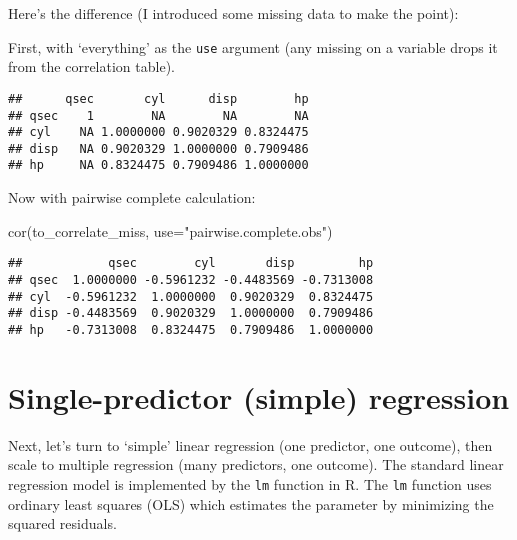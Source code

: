 \documentclass[
]{book}
\newenvironment{Shaded}{\begin{snugshade}}{\end{snugshade}}
\newcommand{\AttributeTok}[1]{\textcolor[rgb]{0.77,0.63,0.00}{#1}}
\newcommand{\CommentTok}[1]{\textcolor[rgb]{0.56,0.35,0.01}{\textit{#1}}}
\newcommand{\ConstantTok}[1]{\textcolor[rgb]{0.00,0.00,0.00}{#1}}
\newcommand{\DecValTok}[1]{\textcolor[rgb]{0.00,0.00,0.81}{#1}}
\newcommand{\FunctionTok}[1]{\textcolor[rgb]{0.00,0.00,0.00}{#1}}
\newcommand{\NormalTok}[1]{#1}
\newcommand{\OtherTok}[1]{\textcolor[rgb]{0.56,0.35,0.01}{#1}}
\newcommand{\SpecialCharTok}[1]{\textcolor[rgb]{0.00,0.00,0.00}{#1}}
\newcommand{\StringTok}[1]{\textcolor[rgb]{0.31,0.60,0.02}{#1}}
\begin{document}
Here's the difference (I introduced some missing data to make the point):

First, with `everything' as the \texttt{use} argument (any missing on a variable drops it from the correlation table).

\begin{Shaded}
\end{Shaded}

\begin{verbatim}
##      qsec       cyl      disp        hp
## qsec    1        NA        NA        NA
## cyl    NA 1.0000000 0.9020329 0.8324475
## disp   NA 0.9020329 1.0000000 0.7909486
## hp     NA 0.8324475 0.7909486 1.0000000
\end{verbatim}

Now with pairwise complete calculation:

\begin{Shaded}
\begin{Highlighting}[]
\FunctionTok{cor}\NormalTok{(to\_correlate\_miss, }\AttributeTok{use=}\StringTok{"pairwise.complete.obs"}\NormalTok{)}
\end{Highlighting}
\end{Shaded}

\begin{verbatim}
##            qsec        cyl       disp         hp
## qsec  1.0000000 -0.5961232 -0.4483569 -0.7313008
## cyl  -0.5961232  1.0000000  0.9020329  0.8324475
## disp -0.4483569  0.9020329  1.0000000  0.7909486
## hp   -0.7313008  0.8324475  0.7909486  1.0000000
\end{verbatim}

\hypertarget{single-predictor-simple-regression}{%
\chapter{Single-predictor (simple) regression}\label{single-predictor-simple-regression}}

Next, let's turn to `simple' linear regression (one predictor, one outcome), then scale to multiple regression (many predictors, one outcome). The standard linear regression model is implemented by the \texttt{lm} function in R. The \texttt{lm} function uses ordinary least squares (OLS) which estimates the parameter by minimizing the squared residuals.
\end{document}
